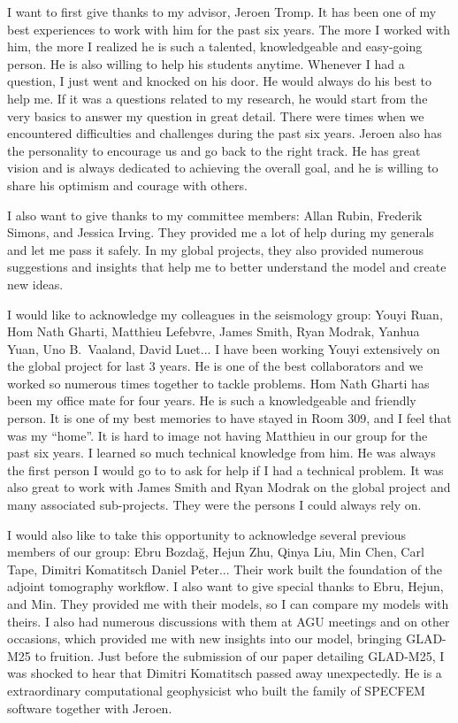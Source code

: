 I want to first give thanks to my advisor, Jeroen Tromp.
It has been one of my best experiences to work with him for the past six years.
The more I worked with him, the more I realized he is such a talented,
knowledgeable and easy-going person. He is also willing to help his students anytime.
Whenever I had a question, I just went and knocked on his door. He would always do his best to help me.
If it was a questions related to my research, he would start from the very basics to
answer my question in great detail.
There were times when we encountered difficulties and challenges during the past six years.
Jeroen also has the personality to encourage us and go back to the right track.
He has great vision and is always dedicated to achieving the overall goal, and he is willing to
share his optimism and courage with others.

I also want to give thanks to my committee members: Allan Rubin, Frederik Simons,
and Jessica Irving. They provided me a lot of help during my generals and let me
pass it safely. In my global projects, they also provided numerous suggestions
and insights that help me to better understand the model and create new ideas.

I would like to acknowledge my colleagues in the seismology group: Youyi Ruan, Hom Nath Gharti, Matthieu Lefebvre, James Smith, Ryan Modrak, Yanhua Yuan, Uno B.~Vaaland, David Luet...
I have been working Youyi extensively on the global project for last 3 years. He is one of the best collaborators and we worked so numerous times together to tackle problems. 
Hom Nath Gharti has been my office mate for four years.
He is such a knowledgeable and friendly person. It is one of my best memories to have stayed in Room 309, and I feel that was my ``home''.
It is hard to image not having Matthieu in
our group for the past six years. I learned so much technical knowledge from him. He was always the first person I would go to to ask for help if I had a technical
problem.
It was also great to work with James Smith and Ryan Modrak on the global
project and many associated sub-projects. They were the persons I could always
rely on.

I would also like to take this opportunity to acknowledge several previous members of our
group: Ebru Bozda\u g, Hejun Zhu, Qinya Liu, Min Chen, Carl Tape, Dimitri Komatitsch
Daniel Peter... Their work built the foundation of the adjoint tomography workflow.
I also want to give special thanks to Ebru, Hejun, and Min. They provided me with
their models, so I can compare my models with theirs. I also had numerous discussions
with them at AGU meetings and on other occasions, which provided me with new insights into
our model, bringing GLAD-M25 to fruition. Just before the submission of our paper detailing
GLAD-M25, I was shocked to hear that Dimitri Komatitsch passed away unexpectedly.
He is a extraordinary computational geophysicist who built the family of SPECFEM
software together with Jeroen.

